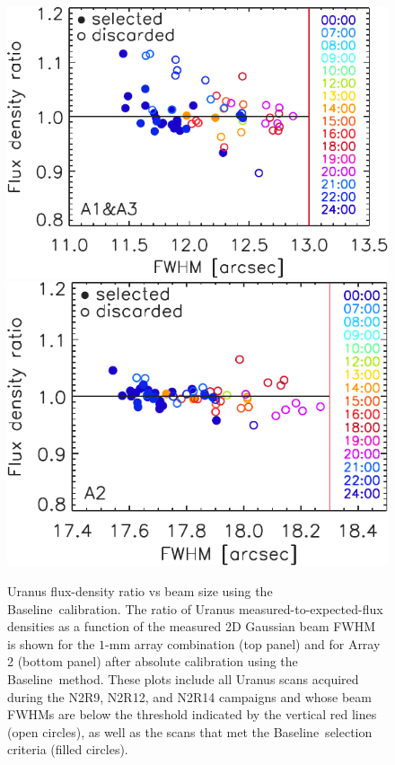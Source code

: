 \documentclass[traditionalabstract]{aa}
\newcommand{\baseline}{Baseline}%
\begin{document}
{\begin{figure}[!htbp]
\begin{center}
\includegraphics[clip=true, trim={0, -0.3cm, -0.3cm, 0}, width=0.72\linewidth]{Figures/plot_flux_density_ratio_fwhm_uranus_corrected_skydip_narrow_1mm.pdf}
\includegraphics[clip=true, trim={0cm, -0.3cm, -0.6cm, 0}, width=0.707\linewidth]{Figures/plot_flux_density_ratio_fwhm_uranus_corrected_skydip_narrow_a2.pdf}
\caption[Uranus flux density stability against FWHM]{ Uranus flux-density ratio vs beam size using the \baseline\ calibration. The ratio
of Uranus measured-to-expected-flux densities as a function of the
measured 2D Gaussian beam FWHM is shown for the $1$-mm array
combination (top panel) and for Array 2 (bottom panel) after absolute calibration using the \baseline\ method. These plots include all Uranus scans acquired during the 
N2R9, N2R12, and N2R14 campaigns and whose beam FWHMs are below the threshold indicated
by the vertical red lines (open circles), as well as the scans that
met the \baseline\ selection criteria (filled circles).}
\label{fig:calib_uranus_vs_fwhm_all}
\end{center}
\end{figure}

}
\end{document}
